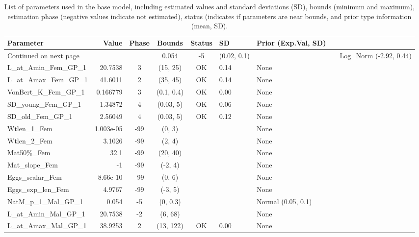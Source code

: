 \documentclass[12pt,]{article}
\begin{document}
\begin{landscape}
\begin{longtable}{lrcccll}
\caption{List of parameters used in
                                          the base model, including estimated 
                                          values and standard deviations (SD), 
                                          bounds (minimum and maximum), 
                                          estimation phase (negative values indicate
                                          not estimated), status (indicates if 
                                          parameters are near bounds, and prior type
                                          information (mean, SD).} \\ 
  \hline
Parameter & Value & Phase & Bounds & Status & SD & Prior (Exp.Val, SD)  \\ 
  \hline 
\endhead 
\hline 
\multicolumn{3}{l}{\footnotesize Continued on next page} 
\endfoot 
\endlastfoot 
 \hline
NatM\_p\_1\_Fem\_GP\_1 & 0.054 & -5 & (0.02, 0.1) &  &  & Log\_Norm (-2.92, 0.44) \\ 
  L\_at\_Amin\_Fem\_GP\_1 & 20.7538 & 3 & (15, 25) & OK & 0.14 & None \\ 
  L\_at\_Amax\_Fem\_GP\_1 & 41.6011 & 2 & (35, 45) & OK & 0.14 & None \\ 
  VonBert\_K\_Fem\_GP\_1 & 0.166779 & 3 & (0.1, 0.4) & OK & 0.00 & None \\ 
  SD\_young\_Fem\_GP\_1 & 1.34872 & 4 & (0.03, 5) & OK & 0.06 & None \\ 
  SD\_old\_Fem\_GP\_1 & 2.56049 & 4 & (0.03, 5) & OK & 0.12 & None \\ 
  Wtlen\_1\_Fem & 1.003e-05 & -99 & (0, 3) &  &  & None \\ 
  Wtlen\_2\_Fem & 3.1026 & -99 & (2, 4) &  &  & None \\ 
  Mat50\%\_Fem & 32.1 & -99 & (20, 40) &  &  & None \\ 
  Mat\_slope\_Fem & -1 & -99 & (-2, 4) &  &  & None \\ 
  Eggs\_scalar\_Fem & 8.66e-10 & -99 & (0, 6) &  &  & None \\ 
  Eggs\_exp\_len\_Fem & 4.9767 & -99 & (-3, 5) &  &  & None \\ 
  NatM\_p\_1\_Mal\_GP\_1 & 0.054 & -5 & (0, 0.3) &  &  & Normal (0.05, 0.1) \\ 
  L\_at\_Amin\_Mal\_GP\_1 & 20.7538 & -2 & (6, 68) &  &  & None \\ 
  L\_at\_Amax\_Mal\_GP\_1 & 38.9253 & 2 & (13, 122) & OK & 0.00 & None \\ 

\end{longtable}
\end{landscape}
\end{document}
